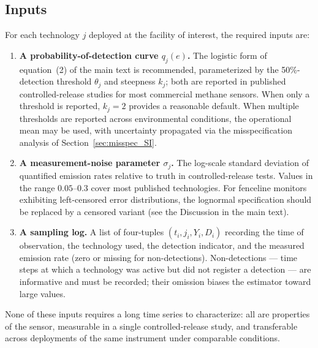 \documentclass[11pt]{article}
\newcommand{\new}[1]{{\color{blue}#1}}
\begin{document}
\subsection{Inputs}
\new{For each technology $j$ deployed at the facility of interest, the required inputs are:
\begin{enumerate}
    \item \textbf{A probability-of-detection curve $q_j(e)$.} The logistic form of equation~(2) of the main text is recommended, parameterized by the 50\%-detection threshold $\theta_j$ and steepness $k_j$; both are reported in published controlled-release studies for most commercial methane sensors. When only a threshold is reported, $k_j = 2$ provides a reasonable default. When multiple thresholds are reported across environmental conditions, the operational mean may be used, with uncertainty propagated via the misspecification analysis of Section~\ref{sec:misspec_SI}.
    \item \textbf{A measurement-noise parameter $\sigma_j$.} The log-scale standard deviation of quantified emission rates relative to truth in controlled-release tests. Values in the range $0.05$--$0.3$ cover most published technologies. For fenceline monitors exhibiting left-censored error distributions, the lognormal specification should be replaced by a censored variant (see the Discussion in the main text).
    \item \textbf{A sampling log.} A list of four-tuples $(t_i, j_i, Y_i, D_i)$ recording the time of observation, the technology used, the detection indicator, and the measured emission rate (zero or missing for non-detections). Non-detections — time steps at which a technology was active but did not register a detection — are informative and must be recorded; their omission biases the estimator toward large values.
\end{enumerate}
None of these inputs requires a long time series to characterize: all are properties of the sensor, measurable in a single controlled-release study, and transferable across deployments of the same instrument under comparable conditions.}
\end{document}
